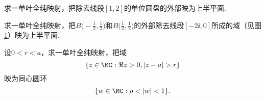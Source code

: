 \begin{xiti}
\begin{figure}[!ht]
\begin{minipage}[b]{0.48\linewidth}
\caption{\label{fig2.16}}
\end{minipage}
\end{figure}
\item 求一单叶全纯映射，把除去线段$[1,2]$的单位圆盘的外部映为上半平面.
\item 求一单叶全纯映射，把$B\bigg(-\frac12,\frac12\bigg)$和$B\bigg(\frac12,\frac12\bigg)$的外部除去线段$[-2\ii,0]$所成的域（见图 \ref{fig2.16}）映为上半平面.
\item 设$0<r<a$，求一单叶全纯映射，把域
\[\{z\in\MC:\Re z>0,|z-a|>r\}\]
映为同心圆环
\[\{w\in\MC:\rho<|w|<1\}.\]
\end{xiti}
